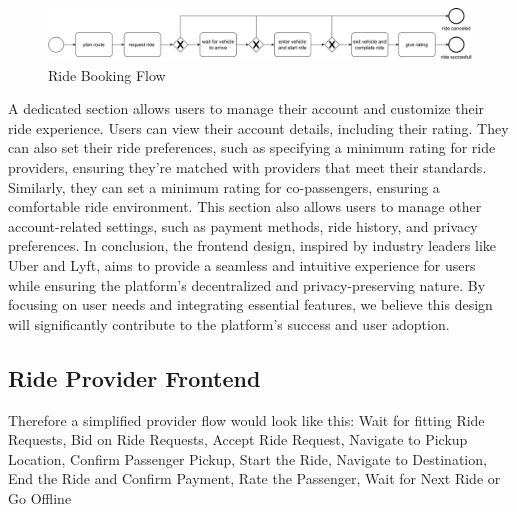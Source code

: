 \begin{figure}[h]
    \centering
    \includegraphics[width=\linewidth]{data/3.svg}
    \caption{Ride Booking Flow}
    \label{fig:directSVG}
\end{figure}

A dedicated section allows users to manage their account and customize their ride experience. Users can view their account details, including their rating. They can also set their ride preferences, such as specifying a minimum rating for ride providers, ensuring they're matched with providers that meet their standards. Similarly, they can set a minimum rating for co-passengers, ensuring a comfortable ride environment. This section also allows users to manage other account-related settings, such as payment methods, ride history, and privacy preferences. In conclusion, the frontend design, inspired by industry leaders like Uber and Lyft, aims to provide a seamless and intuitive experience for users while ensuring the platform's decentralized and privacy-preserving nature. By focusing on user needs and integrating essential features, we believe this design will significantly contribute to the platform's success and user adoption.













































\subsection{Ride Provider Frontend}
Therefore a simplified provider flow would look like this: Wait for fitting Ride Requests, Bid on Ride Requests, Accept Ride Request, Navigate to Pickup Location, Confirm Passenger Pickup, Start the Ride, Navigate to Destination, End the Ride and Confirm Payment, Rate the Passenger, Wait for Next Ride or Go Offline

